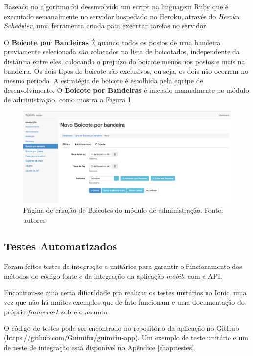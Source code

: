 Baseado no algoritmo foi desenvolvido um script na linguagem Ruby que é executado semanalmente no servidor hospedado no Heroku, através do \textit{Heroku Scheduler}, uma ferramenta criada para executar tarefas no servidor.

O \textbf{Boicote por Bandeiras} É quando todos os postos de uma bandeira previamente selecionada são colocados na lista de boicotados, independente da distância entre eles, colocando o prejuízo do boicote menos nos postos e mais na bandeira. Os dois tipos de boicote são exclusivos, ou seja, os dois não ocorrem no mesmo período. A estratégia de boicote é escolhida pela equipe de desenvolvimento. O \textbf{Boicote por Bandeiras} é iniciado manualmente no módulo de administração, como mostra a Figura \ref{img:admin-2}

\begin{figure}[H]
    \centering
    \includegraphics[scale=0.32]{figuras/admin-2.png}
    \caption[Página de criação de Boicotes do módulo de administração]{Página de criação de Boicotes do módulo de administração. Fonte: autores}
    \label{img:admin-2}
\end{figure}

\subsection{Testes Automatizados}

Foram feitos testes de integração e unitários para garantir o funcionamento dos métodos do código fonte e da integração da aplicação \textit{mobile} com a API.

Encontrou-se uma certa dificuldade pra realizar os testes unitários no Ionic, uma vez que não há muitos exemplos que de fato funcionam e uma documentação do próprio \textit{framework} sobre o assunto.

O código de testes pode ser encontrado no repositório da aplicação no GitHub (https://github.com/Guimifiu/guimifiu-app). Um exemplo de teste unitário e um de teste de integração está disponível no Apêndice \ref{chap:testes}.

